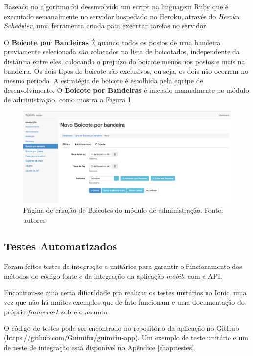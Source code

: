 Baseado no algoritmo foi desenvolvido um script na linguagem Ruby que é executado semanalmente no servidor hospedado no Heroku, através do \textit{Heroku Scheduler}, uma ferramenta criada para executar tarefas no servidor.

O \textbf{Boicote por Bandeiras} É quando todos os postos de uma bandeira previamente selecionada são colocados na lista de boicotados, independente da distância entre eles, colocando o prejuízo do boicote menos nos postos e mais na bandeira. Os dois tipos de boicote são exclusivos, ou seja, os dois não ocorrem no mesmo período. A estratégia de boicote é escolhida pela equipe de desenvolvimento. O \textbf{Boicote por Bandeiras} é iniciado manualmente no módulo de administração, como mostra a Figura \ref{img:admin-2}

\begin{figure}[H]
    \centering
    \includegraphics[scale=0.32]{figuras/admin-2.png}
    \caption[Página de criação de Boicotes do módulo de administração]{Página de criação de Boicotes do módulo de administração. Fonte: autores}
    \label{img:admin-2}
\end{figure}

\subsection{Testes Automatizados}

Foram feitos testes de integração e unitários para garantir o funcionamento dos métodos do código fonte e da integração da aplicação \textit{mobile} com a API.

Encontrou-se uma certa dificuldade pra realizar os testes unitários no Ionic, uma vez que não há muitos exemplos que de fato funcionam e uma documentação do próprio \textit{framework} sobre o assunto.

O código de testes pode ser encontrado no repositório da aplicação no GitHub (https://github.com/Guimifiu/guimifiu-app). Um exemplo de teste unitário e um de teste de integração está disponível no Apêndice \ref{chap:testes}.

